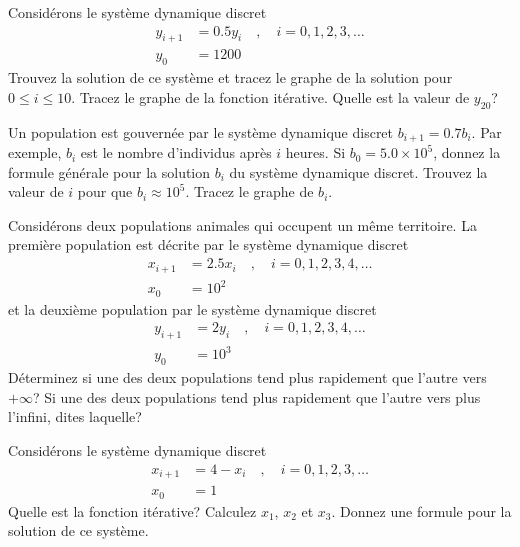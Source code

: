 \begin{question}[\life]
Considérons le système dynamique discret
\begin{align*}
y_{i+1} &= 0.5 y_i \quad , \quad i=0, 1, 2, 3, \ldots \\
y_0 &= 1200
\end{align*}
Trouvez la solution de ce système et tracez le graphe de la solution pour
$0 \leq i \leq 10$.  Tracez le graphe de la fonction itérative.
Quelle est la valeur de $y_{20}$?
\label{6Q72}
\end{question}

\begin{question}[\life]
Un population est gouvernée par le système dynamique discret
$b_{i+1} = 0.7 b_i$.  Par exemple, $b_i$ est le nombre d'individus
après $i$ heures.  Si $b_0 = 5.0 \times 10^5$, donnez la formule
générale pour la solution $b_i$ du système dynamique discret.  Trouvez
la valeur de $i$ pour que $b_i \approx 10^5$.  Tracez le graphe de $b_i$.
\label{6Q73}
\end{question}

\begin{question}[\life]
Considérons deux populations animales qui occupent un même territoire.
La première population est décrite par le système dynamique discret
\begin{equation} \label{sect26eq1}
\begin{split}
x_{i+1} & = 2.5 x_i \quad , \quad i=0, 1, 2, 3, 4, \ldots \\
x_0 &= 10^2
\end{split}
\end{equation}
et la deuxième population par le système dynamique discret
\begin{equation}
\begin{split}  \label{sect26eq2}
y_{i+1} & = 2 y_i \quad , \quad i=0, 1, 2, 3, 4, \ldots \\
y_0 &= 10^3
\end{split}
\end{equation}
Déterminez si une des deux populations tend plus rapidement que l'autre
vers $+\infty$?  Si une des deux populations tend plus rapidement que
l'autre vers plus l'infini, dites laquelle?
\label{6Q74}
\end{question}

\begin{question}[\life]
Considérons le système dynamique discret
\begin{align*}
x_{i+1} &= 4-x_i \quad , \quad i=0, 1, 2, 3, \ldots \\
x_0 &= 1
\end{align*}
Quelle est la fonction itérative?  Calculez $x_1$, $x_2$ et $x_3$.
Donnez une formule pour la solution de ce système.
\label{6Q75}
\end{question}

